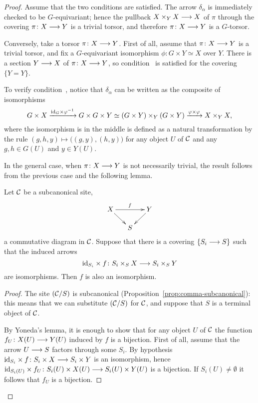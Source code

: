 \begin{4   STACKS}
\begin{4.4 Descent along torsors}
\begin{proof}
Assume that the two conditions are satisfied. The arrow $\delta_\alpha$ is immediately checked to be $G$-equivariant; hence the pullback $X \times_Y X \arr X$ of $\pi$ through the covering $\pi \colon X \arr Y$ is a trivial torsor, and therefore $\pi \colon X \arr Y$ is a $G$-torsor.

Conversely, take a torsor $\pi \colon X \arr Y$. First of all, assume that $\pi \colon X \arr Y$ is a trivial torsor, and fix a $G$-equivariant isomorphism $\phi \colon G \times Y \simeq X$ over $Y$. There is a section $Y \arr X$ of $\pi\colon X \arr Y$, so condition~ is satisfied for the covering $\{Y = Y\}$.

To verify condition~, notice that $\delta_\alpha$ can be written as the composite of isomorphisms
   \[
   G \times X \xrightarrow{\mathrm{id}_G \times\varphi^{-1}}
   G \times G \times Y \simeq
   (G \times Y) \times_Y (G \times Y) \xrightarrow{\varphi \times \varphi}
   X \times_Y X,
   \]
where the isomorphism is in the middle is defined as a natural transformation by the rule $(g, h, y) \mapsto \bigl((g,y), (h,y)\bigr)$ for any object $U$ of $\mathcal{C}$ and any $g, h \in G(U)$ and $y \in Y(U)$.

In the general case, when $\pi \colon X \arr Y$ is not necessarily trivial, the result follows from the previous case and the following lemma.

\begin{lemma}\label{lem:local-isom}
Let $\mathcal{C}$ be a subcanonical site, 
   \[
   \xymatrix@-10pt{
   X \ar[rr]^f \ar[rd] &&
   Y \ar[ld]\\
   &S
   }
   \]
a commutative diagram in $\mathcal{C}$. Suppose that there is a covering $\{S_i \arr S\}$ such that the induced arrows
   \[
   \id_{S_i} \times f \colon S_i \times_S X
   \arr S_i \times_S Y
   \]
are isomorphisms. Then $f$ is also an isomorphism.
\end{lemma}

\begin{proof}
The site $(\mathcal{C}/S)$ is subcanonical (Proposition~\ref{prop:comma-subcanonical}): this means that we can substitute $(\mathcal{C}/S)$ for $\mathcal{C}$, and suppose that $S$ is a terminal object of $\mathcal{C}$.

By Yoneda's lemma, it is enough to show that for any object $U$ of $\mathcal{C}$ the function $f_U \colon X(U) \arr Y(U)$ induced by $f$ is a bijection. First of all, assume that the arrow $U \arr S$ factors through some $S_i$. By hypothesis $\id_{S_i} \times f \colon S_i \times X \arr S_i \times Y$ is an isomorphism, hence $\id_{S_i(U)} \times f_U \colon S_i(U) \times X(U) \arr S_i(U) \times Y(U)$ is a bijection. If $S_i(U) \neq \emptyset$ it follows that $f_U$ is a bijection.


\end{proof}
\end{proof}
\end{4.4 Descent along torsors}
\end{4   STACKS}
